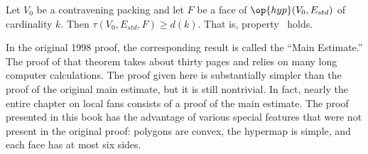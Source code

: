 %






\begin{lemma}\label{lemma:main} 
Let $V_0$ be a contravening packing and let $F$ be a
face of $\op{hyp}(V_0,E_{std})$ of cardinality $k$.  Then
$\tau(V_0,E_{std},F) \ge d(k)$.
That is, property~ holds.  
\end{lemma}
%
%


\begin{remark}
  In the original 1998 proof, the corresponding result is called the
  ``Main Estimate.''  The proof of that theorem takes about thirty pages
  and relies on many long computer calculations.  The proof given here
  is substantially simpler than the proof of the original main
  estimate, but it is still nontrivial. In fact, nearly the entire
  chapter on local fans consists of a proof of the main estimate.
  The proof presented in this book has the advantage of various
  special features that were not present in the original proof:
  polygons are convex, the hypermap is simple, and each face has
  at most six sides.
\end{remark}




